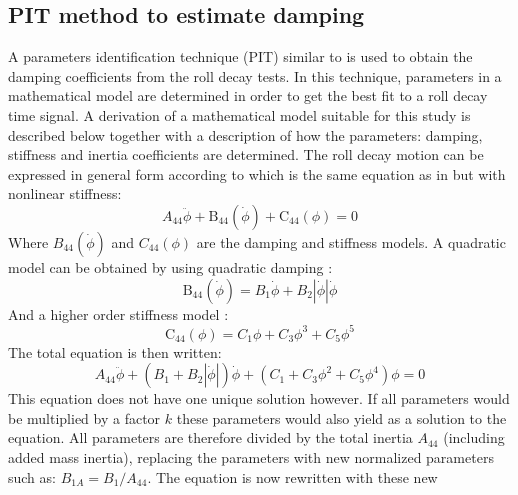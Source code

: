 \subsection*{PIT method to estimate
damping}\label{pit-method-to-estimate-damping}
\label{se:pit}
A parameters identification technique (PIT) similar to
\citep{7505983/EXYJELCU} is used to obtain the damping coefficients from
the roll decay tests. In this technique, parameters in a mathematical
model are determined in order to get the best fit to a roll decay time
signal. A derivation of a mathematical model suitable for this study is
described below together with a description of how the parameters:
damping, stiffness and inertia coefficients are determined. The roll
decay motion can be expressed in general form according to
\citep{7505983/KL7A3RIV} which is the same equation as in
\citep{7505983/FB64RGPF} but with nonlinear stiffness:
\begin{equation}
A_{44} \ddot{\phi} + \operatorname{B_{44}}\left(\dot{\phi}\right) + \operatorname{C_{44}}\left(\phi\right) = 0
\label{eq:roll_decay_equation_general_himeno}
\end{equation}
Where $B_{44}(\dot{\phi})$ and $C_{44}(\phi)$ are the damping and
stiffness models. A quadratic model can be obtained by using quadratic
damping \citep{7505983/FB64RGPF}:
\begin{equation}
\operatorname{B_{44}}\left(\dot{\phi}\right) = B_{1} \dot{\phi} + B_{2} \left|{\dot{\phi}}\right| \dot{\phi}
\label{eq:b44_quadratic_equation}
\end{equation}
And a higher order stiffness model \citep{7505983/KL7A3RIV}:
\begin{equation}
\operatorname{C_{44}}\left(\phi\right) = C_{1} \phi + C_{3} \phi^{3} + C_{5} \phi^{5}
\label{eq:restoring_equation_cubic}
\end{equation}
The total equation is then written:
\begin{equation}
A_{44} \ddot{\phi} + \left(B_{1} + B_{2} \left|{\dot{\phi}}\right|\right) \dot{\phi} + \left(C_{1} + C_{3} \phi^{2} + C_{5} \phi^{4}\right) \phi = 0
\label{eq:roll_decay_equation_quadratic}
\end{equation}
This equation does not have one unique solution however. If all
parameters would be multiplied by a factor $k$ these parameters would
also yield as a solution to the equation. All parameters are therefore
divided by the total inertia $A_{44}$ (including added mass inertia),
replacing the parameters with new normalized parameters such as:
$B_{1A} = B_1/A_{44}$. The equation is now rewritten with these new
